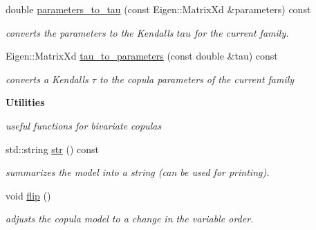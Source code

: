 \begin{DoxyCompactItemize}
double \hyperlink{classvinecopulib_1_1_bicop_ac3d54d13bccaab2ab249599ee133c3c5}{parameters\+\_\+to\+\_\+tau} (const Eigen\+::\+Matrix\+Xd \&parameters) const
\begin{DoxyCompactList}\small\item\em converts the parameters to the Kendall\textquotesingle{}s $ tau $ for the current family. \end{DoxyCompactList}\item 
Eigen\+::\+Matrix\+Xd \hyperlink{classvinecopulib_1_1_bicop_a2664461e9ef54c1596a2db7d1592af20}{tau\+\_\+to\+\_\+parameters} (const double \&tau) const
\begin{DoxyCompactList}\small\item\em converts a Kendall\textquotesingle{}s $ \tau $ to the copula parameters of the current family \end{DoxyCompactList}\end{DoxyCompactItemize}
\begin{Indent}\textbf{ Utilities}\par
{\em useful functions for bivariate copulas }\begin{DoxyCompactItemize}
\item 
\mbox{\label{classvinecopulib_1_1_bicop_a8d0b6ed59b962d1349c1c2d49b17ccab}} 
std\+::string \hyperlink{classvinecopulib_1_1_bicop_a8d0b6ed59b962d1349c1c2d49b17ccab}{str} () const
\begin{DoxyCompactList}\small\item\em summarizes the model into a string (can be used for printing). \end{DoxyCompactList}\item 
\mbox{\label{classvinecopulib_1_1_bicop_a59b7087b3857350df25ff684ab96f377}} 
void \hyperlink{classvinecopulib_1_1_bicop_a59b7087b3857350df25ff684ab96f377}{flip} ()
\begin{DoxyCompactList}\small\item\em adjust\textquotesingle{}s the copula model to a change in the variable order. \end{DoxyCompactList}\end{DoxyCompactItemize}
\end{Indent}
